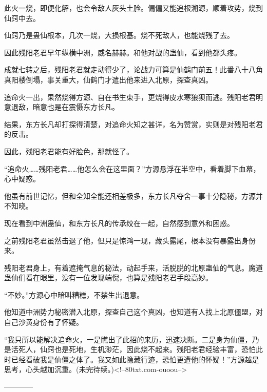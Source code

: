 \begin{this_body}
此火一烧，即便化解，也会令敌人灰头土脸。偏偏又能追根溯源，顺着攻势，烧到仙窍中去。

仙窍乃是蛊仙根本，几次一烧，大损根基。烧不死敌人，也能烧残了去。

因此残阳老君早年纵横中洲，威名赫赫。和他对战的蛊仙，看到他都头疼。

成就七转之后，残阳老君就走动得少了，论战力可算是仙鹤门前五！此番八十八角真阳楼倒塌，事关重大，仙鹤门才遣出他来进入北原，探查真凶。

追命火一出，果然烧得方源、自在书生束手，更烧得皮水寒狼狈而逃。残阳老君明意退敌，暗意也是在震慑东方长凡。

结果，东方长凡却打探得清楚，对追命火知之甚详，名为赞赏，实则是对残阳老君的反击。

因此，残阳老君能有好脸色，那就怪了。

“追命火……残阳老君……他怎么会在这里面？”方源悬浮在半空中，看着脚下血幕，心中疑惑。

他虽有前世记忆，但和全知全能还相差极多，东方长凡夺舍一事十分隐秘，方源并不知晓。

现在看到中洲蛊仙，和东方长凡的传承绞在一起，自然感到意外和困惑。

之前残阳老君虽然击退了他，但只是惊鸿一现，藏头露尾，根本没有暴露出身份来。

残阳老君身上，有着遮掩气息的秘法，动起手来，活脱脱的北原蛊仙的气息。魔道蛊仙们看在眼里，没有一位发现端倪，也算是残阳老君手段高妙。

“不妙。”方源心中暗叫糟糕，不禁生出退意。

他知道中洲势力秘密潜入北原，探查自己这个真凶，也知道有人找上北原僵盟，对自己沙黄身份有了怀疑。

“我只所以能解决追命火，一是瞧出了此招的来历，迅速决断。二是身为仙僵，乃是活死人，仙窍也是死地，生机渺茫，因此烧不起来。残阳老君经验丰富，恐怕此时已经看破我是仙僵之体了。我又如此隐藏行迹，恐怕更遭他的怀疑！”方源越是思考，心头越加沉重。(未完待续。)<!--80txt.com-ouoou-->

------------

\end{this_body}

